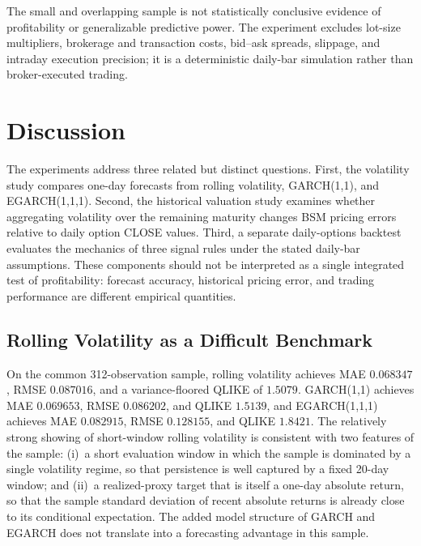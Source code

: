 \documentclass[journal]{IEEEtran}
\begin{document}
The small and overlapping sample is not statistically conclusive evidence of profitability or generalizable predictive power. The experiment excludes lot-size multipliers, brokerage and transaction costs, bid--ask spreads, slippage, and intraday execution precision; it is a deterministic daily-bar simulation rather than broker-executed trading.

\section{Discussion}

The experiments address three related but distinct questions. First, the volatility study compares one-day forecasts from rolling volatility, GARCH(1,1), and EGARCH(1,1,1). Second, the historical valuation study examines whether aggregating volatility over the remaining maturity changes BSM pricing errors relative to daily option CLOSE values. Third, a separate daily-options backtest evaluates the mechanics of three signal rules under the stated daily-bar assumptions. These components should not be interpreted as a single integrated test of profitability: forecast accuracy, historical pricing error, and trading performance are different empirical quantities.

\subsection*{Rolling Volatility as a Difficult Benchmark}

On the common 312-observation sample, rolling volatility achieves MAE $0.068347$, RMSE $0.087016$, and a variance-floored QLIKE of $1.5079$. GARCH(1,1) achieves MAE $0.069653$, RMSE $0.086202$, and QLIKE $1.5139$, and EGARCH(1,1,1) achieves MAE $0.082915$, RMSE $0.128155$, and QLIKE $1.8421$. The relatively strong showing of short-window rolling volatility is consistent with two features of the sample: (i)~a short evaluation window in which the sample is dominated by a single volatility regime, so that persistence is well captured by a fixed 20-day window; and (ii)~a realized-proxy target that is itself a one-day absolute return, so that the sample standard deviation of recent absolute returns is already close to its conditional expectation. The added model structure of GARCH and EGARCH does not translate into a forecasting advantage in this sample.
\end{document}
